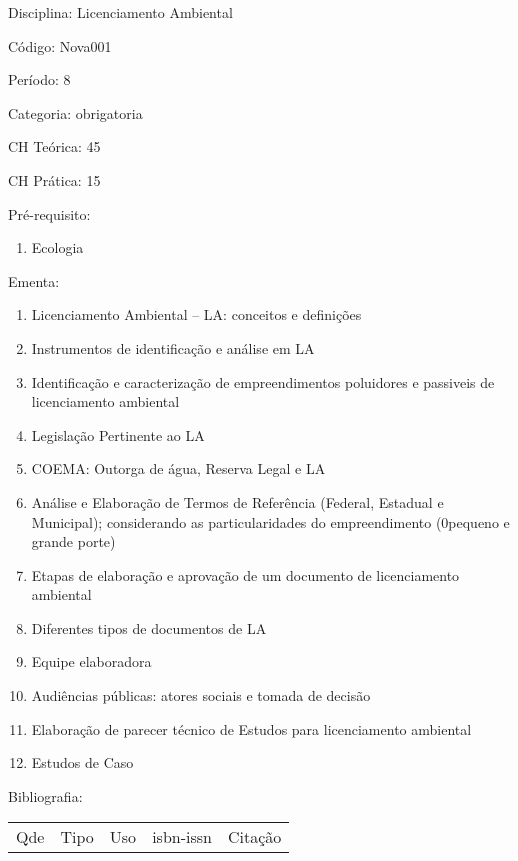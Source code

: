 \documentclass[12pt,a4paper,twoside]{report}
\begin{document}
Disciplina: Licenciamento Ambiental

Código: Nova001

Período: 8

Categoria: obrigatoria

CH Teórica: 45

CH Prática: 15




Pré-requisito:
\begin{enumerate}
\item Ecologia
\end{enumerate}

Ementa:
\begin{enumerate}
\item Licenciamento Ambiental – LA: conceitos e definições
\item Instrumentos de identificação e análise em LA
\item Identificação e caracterização de empreendimentos poluidores e passiveis de licenciamento ambiental
\item Legislação Pertinente ao LA
\item COEMA: Outorga de água, Reserva Legal e LA
\item Análise e Elaboração de Termos de Referência (Federal, Estadual e Municipal); considerando as particularidades do empreendimento (0pequeno e grande porte)
\item Etapas de elaboração e aprovação de um documento de licenciamento ambiental
\item Diferentes tipos de documentos de LA
\item Equipe elaboradora
\item Audiências públicas: atores sociais e tomada de decisão
\item Elaboração de parecer técnico de Estudos para licenciamento ambiental
\item Estudos de Caso
\end{enumerate}



Bibliografia:


\begin{tabular}{llllp{8cm}}
Qde & Tipo & Uso & isbn-issn & Citação \\
\end{tabular}
\end{document}
